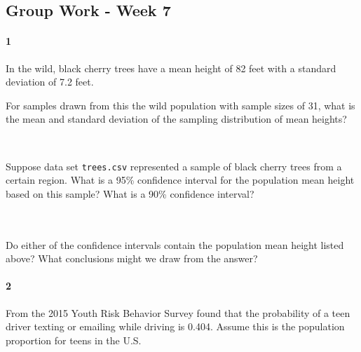 \documentclass{article}
\begin{document}
\begin{flushleft}
\section*{Group Work - Week 7}
\paragraph{1} In the wild, black cherry trees have a mean height of 82 feet with a standard deviation of 7.2 feet. 
\begin{enumalpha}
\item For samples drawn from this the wild population with sample sizes of 31, what is the mean and standard deviation of the sampling distribution of mean heights?\\
\medskip

\\
\smallskip
{}

\vspace{0.5in}
\item Suppose data set \verb+trees.csv+ represented a sample of black cherry trees from a certain region. What is a 95\% confidence interval for the population mean height based on this sample? What is a 90\% confidence interval?\\
\medskip 
{}\\
\medskip 
{}\\

\vspace{0.5in}

\item Do either of the confidence intervals contain the population mean height listed above? What conclusions might we draw from the answer?\\
\medskip


\end{enumalpha}

\newpage

\paragraph{2} From the 2015 Youth Risk Behavior Survey found that the probability of a teen driver texting or emailing while driving is 0.404. Assume this is the population proportion for teens in the U.S.


\end{flushleft}
\end{document}

